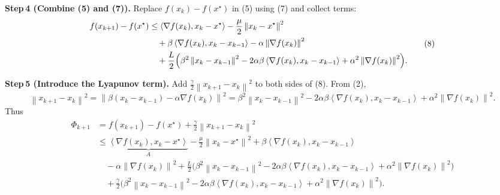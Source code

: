 \documentclass{article}
\newcommand{\norm}[1]{\left\lVert#1\right\rVert}
\newcommand{\inner}[2]{\left\langle #1,#2\right\rangle}
\begin{document}
\bigskip
\noindent\textbf{Step 4 (Combine (5) and (7)).}  
Replace $f(x_k)-f(x^\star)$ in (5) using (7) and collect terms:
\[
\begin{aligned}
f(x_{k+1})-f(x^\star)
&\le \inner{\nabla f(x_k)}{x_k-x^\star}
    -\frac{\mu}{2}\norm{x_k-x^\star}^{2}\\
&\quad +\beta\inner{\nabla f(x_k)}{x_k-x_{k-1}}
    -\alpha \norm{\nabla f(x_k)}^{2}\\
&\quad +\frac{L}{2}\Bigl(\beta^{2}\norm{x_k-x_{k-1}}^{2}
                       -2\alpha\beta\inner{\nabla f(x_k)}{x_k-x_{k-1}}
                       +\alpha^{2}\norm{\nabla f(x_k)}^{2}\Bigr).
\end{aligned}
\tag{8}
\]

\bigskip
\noindent\textbf{Step 5 (Introduce the Lyapunov term).}  
Add $\frac{\gamma}{2}\norm{x_{k+1}-x_k}^{2}$ to both sides of (8).  
From (2),
\[
\norm{x_{k+1}-x_k}^{2}
= \norm{\beta (x_k-x_{k-1})-\alpha \nabla f(x_k)}^{2}
= \beta^{2}\norm{x_k-x_{k-1}}^{2}
   -2\alpha\beta\inner{\nabla f(x_k)}{x_k-x_{k-1}}
   +\alpha^{2}\norm{\nabla f(x_k)}^{2}.
\tag{9}
\]
Thus
\[
\begin{aligned}
\Phi_{k+1}
&=f(x_{k+1})-f(x^\star)+\frac{\gamma}{2}\norm{x_{k+1}-x_k}^{2}\\[2mm]
&\le \underbrace{\inner{\nabla f(x_k)}{x_k-x^\star}}_{A}
   -\frac{\mu}{2}\norm{x_k-x^\star}^{2}
   +\beta\inner{\nabla f(x_k)}{x_k-x_{k-1}}\\
&\quad -\alpha \norm{\nabla f(x_k)}^{2}
   +\frac{L}{2}\bigl(\beta^{2}\norm{x_k-x_{k-1}}^{2}
                     -2\alpha\beta\inner{\nabla f(x_k)}{x_k-x_{k-1}}
                     +\alpha^{2}\norm{\nabla f(x_k)}^{2}\bigr)\\
&\quad +\frac{\gamma}{2}\bigl(\beta^{2}\norm{x_k-x_{k-1}}^{2}
                     -2\alpha\beta\inner{\nabla f(x_k)}{x_k-x_{k-1}}
                     +\alpha^{2}\norm{\nabla f(x_k)}^{2}\bigr).
\end{aligned}
\tag{10}
\]
\end{document}
